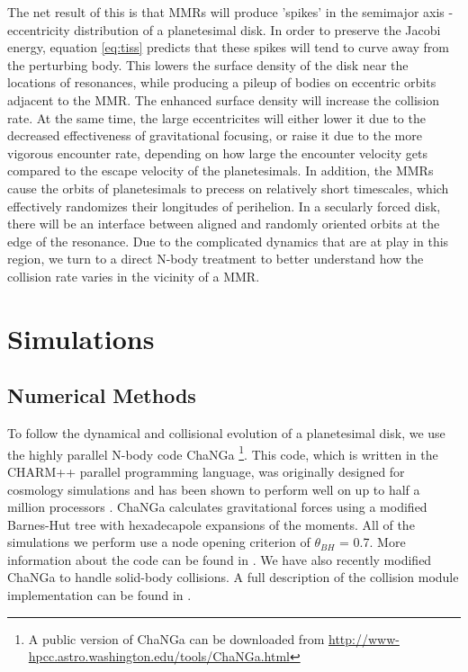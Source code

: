 \documentclass[twocolumn]{aastex63}
\begin{document}
The net result of this is that MMRs will produce 'spikes' in the semimajor axis - eccentricity distribution of a planetesimal disk. In order to 
preserve the Jacobi energy, equation \ref{eq:tiss} predicts that these spikes will tend to curve away from the perturbing body. This lowers the 
surface density of the disk near the locations of resonances, while producing a pileup of bodies on eccentric orbits adjacent to the MMR. The 
enhanced surface density will increase the collision rate. At the same time, the large eccentricites will either lower it due to the decreased 
effectiveness of gravitational focusing, or raise it due to the more vigorous encounter rate, depending on how large the encounter velocity gets 
compared to the escape velocity of the planetesimals. In addition, the MMRs cause the orbits of planetesimals to precess on relatively short 
timescales, which effectively randomizes their longitudes of perihelion. In a secularly forced disk, there will be an interface between aligned 
and randomly oriented orbits at the edge of the resonance. Due to the complicated dynamics that are at play in this region, we turn to a direct 
N-body treatment to better understand how the collision rate varies in the vicinity of a MMR.

\section{Simulations} \label{sec:sims}

\subsection{Numerical Methods}\label{sec:methods}

To follow the dynamical and collisional evolution of a planetesimal disk, we use the highly parallel N-body code {\sc ChaNGa} 
\footnote{A public version of {\sc ChaNGa} can be downloaded from \url{http://www-hpcc.astro.washington.edu/tools/ChaNGa.html}}. 
This code, which is written in the {\sc CHARM++} parallel programming language, was originally designed for cosmology simulations 
and has been shown to perform well on up to half a million processors \citep{2015AphCom..2..1}. {\sc ChaNGa} calculates 
gravitational forces using a modified Barnes-Hut \citep{1986Natur.324..446B} tree with hexadecapole expansions of the moments. 
All of the simulations we perform use a node opening criterion of $\theta_{BH}$ = 0.7. More information about the code can be found 
in \citet{2008IEEEpds...ChaNGa}. We have also recently modified {\sc ChaNGa} to handle solid-body collisions. A full description of 
the collision module implementation can be found in \citet{2019MNRAS.489.2159W}.
\end{document}
